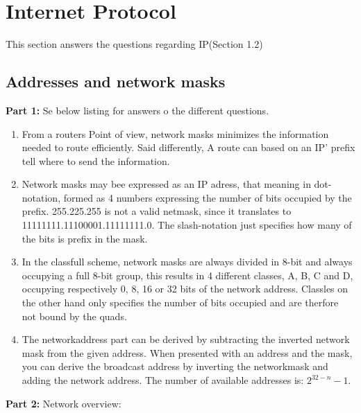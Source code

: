 \section{Internet Protocol}
This section answers the questions regarding IP(Section 1.2)

\subsection{Addresses and network masks}
\textbf{Part 1: } Se below listing for answers o the different questions.

\begin{enumerate}
\item From a routers Point of view, network masks minimizes the information
    needed to route efficiently. Said differently, A route can based on an IP'
    prefix tell where to send the information.
\item Network masks may bee expressed as an IP adress, that meaning in
    dot-notation, formed as 4 numbers expressing the number of bits occupied by the
    prefix. 255.225.255 is not a valid netmask, since it translates to
    11111111.11100001.11111111.0. The slash-notation just specifies how many of the
    bits is prefix in the mask.
\item In the classfull scheme, network masks are always divided in 8-bit and
    always occupying a full 8-bit group, this results in 4 different classes, A, B,
    C and D, occupying respectively 0, 8, 16 or 32 bits of the network address.
    Classles on the other hand only specifies the number of bits occupied and are
    therfore not bound by the quads.
\item The networkaddress part can be derived by subtracting the inverted
    network mask from the given address. When presented with an address and the 
    mask, you can derive the broadcast address by inverting the networkmask and 
    adding the network address. The number of available addresses is: 
    $2^{32 - n}-1$.
\end{enumerate}

\textbf{Part 2: } Network overview:


